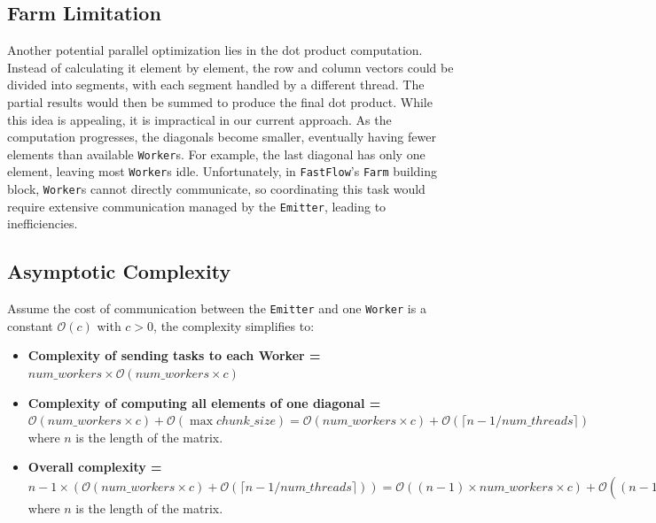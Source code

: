 \subsection*{Farm Limitation}
Another potential parallel optimization lies in the dot product computation. Instead of calculating it element by element, the row and column vectors could be divided into segments, with each segment handled by a different thread. The partial results would then be summed to produce the final dot product. While this idea is appealing, it is impractical in our current approach. As the computation progresses, the diagonals become smaller, eventually having fewer elements than available \texttt{Worker}s. For example, the last diagonal has only one element, leaving most \texttt{Worker}s idle. Unfortunately, in \texttt{FastFlow}'s \texttt{Farm} building block, \texttt{Worker}s cannot directly communicate, so coordinating this task would require extensive communication managed by the \texttt{Emitter}, leading to inefficiencies.

\subsection*{Asymptotic Complexity}
Assume the cost of communication between the \texttt{Emitter} and one \texttt{Worker} is a constant $\mathcal{O}(c)$ with $c > 0$, the complexity simplifies to:

\begin{itemize}
    \item \textbf{Complexity of sending tasks to each Worker =} $num\_workers \times \mathcal{O}(num\_workers \times c)$

    \item \textbf{Complexity of computing all elements of one diagonal =} $ \mathcal{O}(num\_workers \times c) + \mathcal{O}(\max{chunk\_size}) = \mathcal{O}(num\_workers \times c) + \mathcal{O}(\lceil n-1 / num\_threads \rceil)$ where $n$ is the length of the matrix.

    \item \textbf{Overall complexity = } $n-1 \times (\mathcal{O}(num\_workers \times c) + \mathcal{O}(\lceil n-1 / num\_threads \rceil) ) =\mathcal{O}((n - 1) \times num\_workers \times c) + \mathcal{O}((n-1)^{2} / num\_threads)$ where $n$ is the length of the matrix.
\end{itemize}

